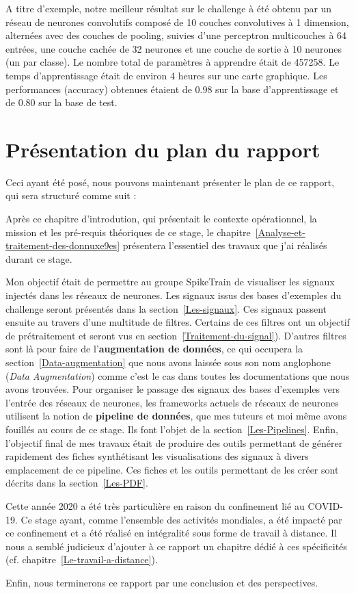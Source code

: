 A titre d'exemple, notre meilleur résultat sur le challenge à été obtenu par un réseau de neurones convolutifs composé de 10 couches convolutives à 1 dimension, alternées avec des couches de pooling, suivies d'une perceptron multicouches à 64 entrées, une couche cachée de 32 neurones et une couche de sortie à 10 neurones (un par classe). Le nombre total de paramètres à apprendre était de 457258. Le temps d'apprentissage était de environ 4 heures sur une carte graphique.
Les performances (accuracy) obtenues étaient de 0.98 sur la base d'apprentissage et de 0.80 sur la base de test.


\hypertarget{plan}{%
\section{Présentation du plan du rapport}%
\label{Présentation du plan du rapport}}

Ceci ayant été posé, nous pouvons maintenant présenter le plan de ce rapport,
qui sera structuré comme suit :

Après ce chapitre d'introdution, qui présentait le contexte opérationnel, la mission et les pré-requis théoriques de ce stage, le
chapitre~\ref{Analyse-et-traitement-des-donnuxe9es} présentera l'essentiel
des travaux que j'ai réalisés durant ce stage.

Mon objectif était de permettre au groupe SpikeTrain de visualiser les signaux
injectés dans les réseaux de neurones.
Les signaux issus des bases d'exemples du challenge seront présentés dans la section~\ref{Les-signaux}.
Ces signaux passent ensuite au travers d'une multitude de filtres.
Certains de ces filtres ont un objectif de prétraitement et seront vus en section~\ref{Traitement-du-signal}).
D'autres filtres sont là pour faire de l'\textbf{augmentation de données}, ce
qui occupera la section~\ref{Data-augmentation} que nous avons laissée sous son
nom anglophone (\textit{Data Augmentation}) comme c'est le cas dans toutes les documentations que nous avons
trouvées.
Pour organiser le passage des signaux des bases d'exemples vers l'entrée des réseaux de neurones, les frameworks actuels de réseaux de neurones utilisent
la notion de \textbf{pipeline de données}, que mes tuteurs et moi même avons
fouillés au cours de ce stage. Ils font l'objet de la
section~\ref{Les-Pipelines}.
Enfin, l'objectif final de mes travaux était de produire des outils permettant
de générer rapidement des fiches synthétisant les visualisations des signaux à divers emplacement de ce pipeline. Ces fiches et les outils permettant de les
créer sont décrits dans la section~\ref{Les-PDF}.

Cette année 2020 a été très particulière en raison du confinement lié au
COVID-19. Ce stage ayant, comme l'ensemble des activités mondiales, a été
impacté par ce confinement et a été réalisé en intégralité sous forme de
travail à distance. Il nous a semblé judicieux d'ajouter à ce rapport un
chapitre dédié à ces spécificités (cf. chapitre~\ref{Le-travail-a-distance}).

Enfin, nous terminerons ce rapport par une conclusion et des perspectives.
